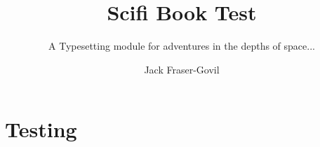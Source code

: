 \documentclass[theme=scifi]{rpgbook}
\title{Scifi Book Test}
\subtitle{A Typesetting module for adventures in the depths of space...}
\author{Jack Fraser-Govil}
\begin{document}
	

	\part{Testing}
\end{document}
